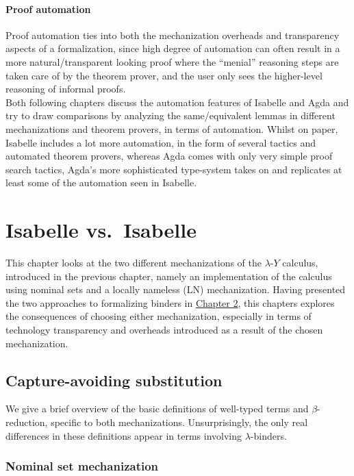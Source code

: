 \documentclass[a4paper, 12pt, twoside]{style/ociamthesis}
\theoremstyle{plain}
\theoremstyle{definition}
\theoremstyle{remark}
\newcommand{\lamy}{\lambda\text{-}Y}
\begin{document}
\subsubsection{Proof automation}\label{proof-automation}

Proof automation ties into both the mechanization overheads and
transparency aspects of a formalization, since high degree of automation
can often result in a more natural/transparent looking proof where the
``menial'' reasoning steps are taken care of by the theorem prover, and
the user only sees the higher-level reasoning of informal proofs.\\
Both following chapters discuss the automation features of Isabelle and
Agda and try to draw comparisons by analyzing the same/equivalent lemmas
in different mechanizations and theorem provers, in terms of automation.
Whilst on paper, Isabelle includes a lot more automation, in the form of
several tactics and automated theorem provers, whereas Agda comes with
only very simple proof search tactics, Agda's more sophisticated
type-system takes on and replicates at least some of the automation seen
in Isabelle.

\hypertarget{comp-isa}{\chapter{Isabelle vs.~Isabelle}\label{comp-isa}}

This chapter looks at the two different mechanizations of the \(\lamy\)
calculus, introduced in the previous chapter, namely an implementation
of the calculus using nominal sets and a locally nameless (LN)
mechanization. Having presented the two approaches to formalizing
binders in \protect\hyperlink{binders}{Chapter 2}, this chapters
explores the consequences of choosing either mechanization, especially
in terms of technology transparency and overheads introduced as a result
of the chosen mechanization.

\section{Capture-avoiding
substitution}\label{capture-avoiding-substitution}

We give a brief overview of the basic definitions of well-typed terms
and \(\beta\)-reduction, specific to both mechanizations.
Unsurprisingly, the only real differences in these definitions appear in
terms involving \(\lambda\)-binders.

\subsection{Nominal set mechanization}\label{nominal-set-mechanization}
\end{document}
